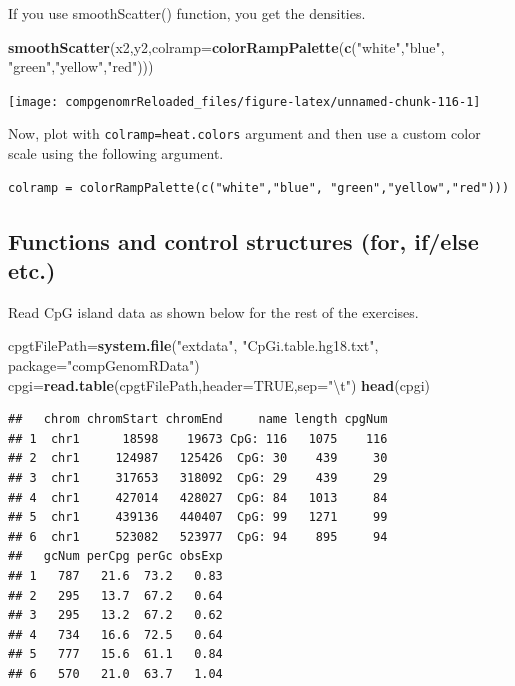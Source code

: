 \documentclass[12pt,]{krantz}
\newenvironment{Shaded}{\begin{snugshade}}{\end{snugshade}}
\newcommand{\CharTok}[1]{\textcolor[rgb]{0.31,0.60,0.02}{#1}}
\newcommand{\DataTypeTok}[1]{\textcolor[rgb]{0.13,0.29,0.53}{#1}}
\newcommand{\KeywordTok}[1]{\textcolor[rgb]{0.13,0.29,0.53}{\textbf{#1}}}
\newcommand{\NormalTok}[1]{#1}
\newcommand{\OtherTok}[1]{\textcolor[rgb]{0.56,0.35,0.01}{#1}}
\newcommand{\StringTok}[1]{\textcolor[rgb]{0.31,0.60,0.02}{#1}}
\begin{document}
If you use smoothScatter() function, you get the densities.

\begin{Shaded}
\begin{Highlighting}[]
\KeywordTok{smoothScatter}\NormalTok{(x2,y2,}\DataTypeTok{colramp=}\KeywordTok{colorRampPalette}\NormalTok{(}\KeywordTok{c}\NormalTok{(}\StringTok{"white"}\NormalTok{,}\StringTok{"blue"}\NormalTok{, }\StringTok{"green"}\NormalTok{,}\StringTok{"yellow"}\NormalTok{,}\StringTok{"red"}\NormalTok{))) }
\end{Highlighting}
\end{Shaded}

\begin{center}\texttt{[image: compgenomrReloaded\_files/figure-latex/unnamed-chunk-116-1]} \end{center}

Now, plot with \texttt{colramp=heat.colors} argument and then use a custom color scale using the following argument.

\begin{verbatim}
colramp = colorRampPalette(c("white","blue", "green","yellow","red")))
\end{verbatim}

\hypertarget{functions-and-control-structures-for-ifelse-etc.-1}{%
\subsection{Functions and control structures (for, if/else etc.)}\label{functions-and-control-structures-for-ifelse-etc.-1}}

Read CpG island data as shown below for the rest of the exercises.

\begin{Shaded}
\begin{Highlighting}[]
\NormalTok{cpgtFilePath=}\KeywordTok{system.file}\NormalTok{(}\StringTok{"extdata"}\NormalTok{,}
                \StringTok{"CpGi.table.hg18.txt"}\NormalTok{,}
                \DataTypeTok{package=}\StringTok{"compGenomRData"}\NormalTok{)}
\NormalTok{cpgi=}\KeywordTok{read.table}\NormalTok{(cpgtFilePath,}\DataTypeTok{header=}\OtherTok{TRUE}\NormalTok{,}\DataTypeTok{sep=}\StringTok{"}\CharTok{\textbackslash{}t}\StringTok{"}\NormalTok{)}
\KeywordTok{head}\NormalTok{(cpgi)}
\end{Highlighting}
\end{Shaded}

\begin{verbatim}
##   chrom chromStart chromEnd     name length cpgNum
## 1  chr1      18598    19673 CpG: 116   1075    116
## 2  chr1     124987   125426  CpG: 30    439     30
## 3  chr1     317653   318092  CpG: 29    439     29
## 4  chr1     427014   428027  CpG: 84   1013     84
## 5  chr1     439136   440407  CpG: 99   1271     99
## 6  chr1     523082   523977  CpG: 94    895     94
##   gcNum perCpg perGc obsExp
## 1   787   21.6  73.2   0.83
## 2   295   13.7  67.2   0.64
## 3   295   13.2  67.2   0.62
## 4   734   16.6  72.5   0.64
## 5   777   15.6  61.1   0.84
## 6   570   21.0  63.7   1.04
\end{verbatim}
\end{document}
